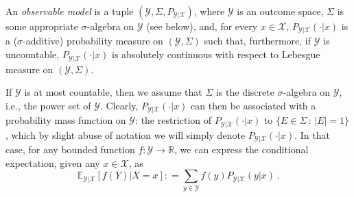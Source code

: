 \documentclass[twoside,11pt]{article}
\newcommand{\reals}{\mathbb{R}}
\newcommand{\states}{\mathcal{X}}
\newcommand{\observs}{\mathcal{Y}}
\newcommand{\coloneqq}{:\!=}
\begin{document}
\begin{definition}
An \emph{observable model} is a tuple $(\observs,\Sigma,P_{\observs\vert \states})$, where $\observs$ is an outcome space, $\Sigma$ is some appropriate $\sigma$-algebra on $\observs$ (see below), and, for every $x\in\states$, $P_{\observs\vert\states}(\cdot\vert x)$ is a ($\sigma$-additive) probability measure on $(\observs,\Sigma)$ such that, furthermore, if $\observs$ is uncountable, $P_{\observs\vert\states}(\cdot\vert x)$ is absolutely continuous with respect to Lebesgue measure on $(\observs,\Sigma)$.
\end{definition}
If $\observs$ is at most countable, then we assume that $\Sigma$ is the discrete $\sigma$-algebra on $\observs$, i.e., the power set of $\observs$. Clearly, $P_{\observs\vert\states}(\cdot\vert x)$ can then be associated with a probability mass function on $\observs$: the restriction of $P_{\observs\vert\states}(\cdot\vert x)$ to $\{E\in\Sigma\,:\,\lvert E\rvert = 1\}$, which by slight abuse of notation we will simply denote $P_{\observs\vert\states}(\cdot\vert x)$. In that case, for any bounded function $f:\observs\to\reals$, we can express the conditional expectation, given any $x\in\states$, as
\begin{equation*}
\mathbb{E}_{\observs\vert\states}[f(Y)\vert X=x] \coloneqq \sum_{y\in\observs} f(y) P_{\observs\vert\states}(y\vert x)\,.
\end{equation*}
\end{document}
